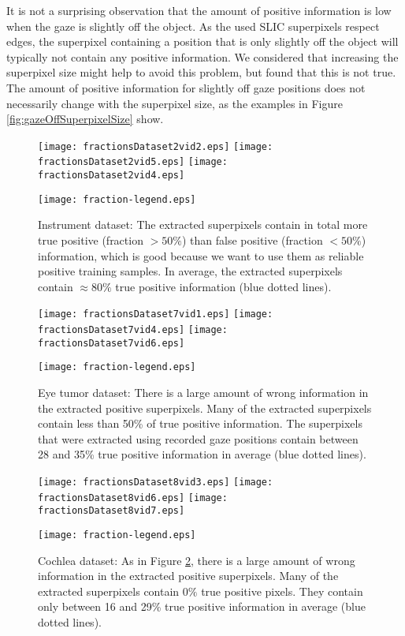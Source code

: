 It is not a surprising observation that the amount of positive information is low when the gaze is slightly off the object. As the used SLIC superpixels respect edges, the superpixel containing a position that is only slightly off the object will typically not contain any positive information. We considered that increasing the superpixel size might help to avoid this problem, but found that this is not true. The amount of positive information for slightly off gaze positions does not necessarily change with the superpixel size, as the examples in Figure \ref{fig:gazeOffSuperpixelSize} show. 
 

\begin{figure}[ht]
	  \texttt{[image: fractionsDataset2vid2.eps]}
	  \texttt{[image: fractionsDataset2vid5.eps]}	  
	  \texttt{[image: fractionsDataset2vid4.eps]}
	  
	  \centering
	  \texttt{[image: fraction-legend.eps]}
	  \caption{Instrument dataset: The extracted superpixels contain in total more true positive (fraction $> 50\%$) than false positive (fraction $< 50\%$) information, which is good because we want to use them as reliable positive training samples. In average, the extracted superpixels contain $\approx 80\%$ true positive information (blue dotted lines).}
	\label{fig:positiveFractionD2}
\end{figure}

\begin{figure}[ht]
	  \texttt{[image: fractionsDataset7vid1.eps]}
	  \texttt{[image: fractionsDataset7vid4.eps]}
	  \texttt{[image: fractionsDataset7vid6.eps]}
	  
	  \centering
	  \texttt{[image: fraction-legend.eps]}
	  \caption{Eye tumor dataset: There is a large amount of wrong information in the extracted positive superpixels. Many of the extracted superpixels contain less than 50\% of true positive information. The superpixels that were extracted using recorded gaze positions contain between 28 and 35\% true positive information in average (blue dotted lines).}
	\label{fig:positiveFractionD7}
\end{figure}

\begin{figure}[ht]
	  \texttt{[image: fractionsDataset8vid3.eps]}
	  \texttt{[image: fractionsDataset8vid6.eps]}
	  \texttt{[image: fractionsDataset8vid7.eps]}
	  
	  \centering
	  \texttt{[image: fraction-legend.eps]}
	  \caption{Cochlea dataset: As in Figure \ref{fig:positiveFractionD7}, there is a large amount of wrong information in the extracted positive superpixels. Many of the extracted superpixels contain  $0\%$ true positive pixels. They contain only between 16 and 29\% true positive information in average (blue dotted lines).}
	\label{fig:positiveFractionD8}
\end{figure}

